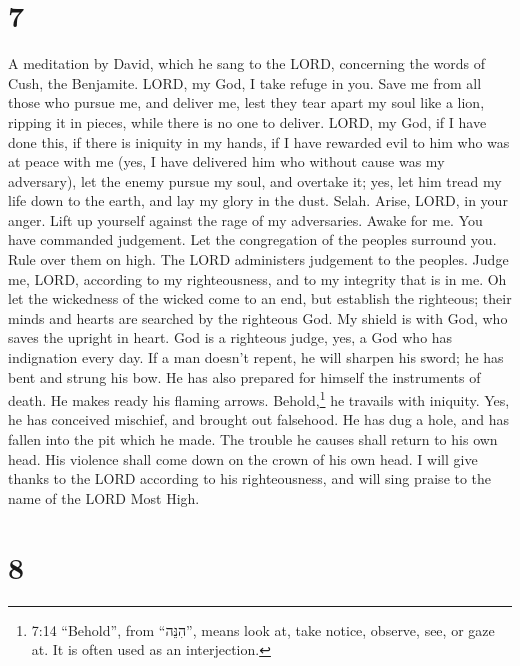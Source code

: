 \hypertarget{section-6}{%
\section{7}\label{section-6}}

A meditation by David, which he sang to the LORD, concerning the words
of Cush, the Benjamite.  LORD, my God, I take refuge in you.
Save me from all those who pursue me, and deliver me,  lest
they tear apart my soul like a lion, ripping it in pieces, while there
is no one to deliver.  LORD, my God, if I have done this, if
there is iniquity in my hands,  if I have rewarded evil to
him who was at peace with me (yes, I have delivered him who without
cause was my adversary),  let the enemy pursue my soul, and
overtake it; yes, let him tread my life down to the earth, and lay my
glory in the dust. Selah.  Arise, LORD, in your anger. Lift
up yourself against the rage of my adversaries. Awake for me. You have
commanded judgement.  Let the congregation of the peoples
surround you. Rule over them on high.  The LORD administers
judgement to the peoples. Judge me, LORD, according to my righteousness,
and to my integrity that is in me.  Oh let the wickedness of
the wicked come to an end, but establish the righteous; their minds and
hearts are searched by the righteous God.  My shield is
with God, who saves the upright in heart.  God is a
righteous judge, yes, a God who has indignation every day. 
If a man doesn't repent, he will sharpen his sword; he has bent and
strung his bow.  He has also prepared for himself the
instruments of death. He makes ready his flaming arrows. 
Behold,\footnote{7:14 ``Behold'', from ``הִנֵּה'', means look at, take
  notice, observe, see, or gaze at. It is often used as an interjection.}
he travails with iniquity. Yes, he has conceived mischief, and brought
out falsehood.  He has dug a hole, and has fallen into the
pit which he made.  The trouble he causes shall return to
his own head. His violence shall come down on the crown of his own head.
 I will give thanks to the LORD according to his
righteousness, and will sing praise to the name of the LORD Most High.

\hypertarget{section-7}{%
\section{8}\label{section-7}}

